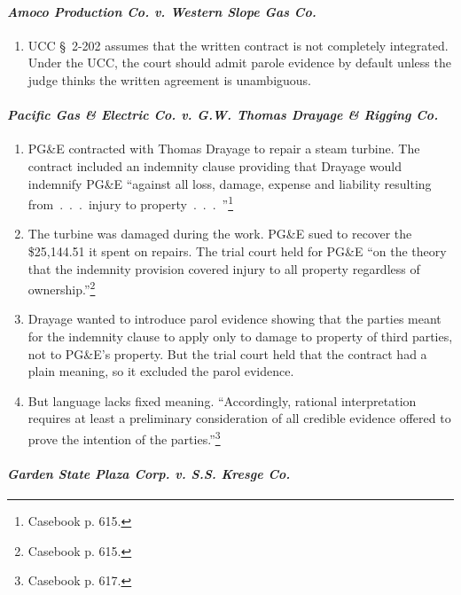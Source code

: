 \paragraph{\emph{Amoco Production Co. v. Western Slope Gas Co.}}

\begin{enumerate}
    \item UCC \S\ 2-202 assumes that the written contract is not completely 
    integrated. Under the UCC, the court should admit parole evidence by 
    default unless the judge thinks the written agreement is unambiguous.
\end{enumerate}

\paragraph{\emph{Pacific Gas \& Electric Co. v. G.W. Thomas Drayage \& Rigging 
Co.}}

\begin{enumerate}
    \item PG\&E contracted with Thomas Drayage to repair a steam turbine. The 
    contract included an indemnity clause providing that Drayage would 
    indemnify PG\&E ``against all loss, damage, expense and liability 
    resulting from~.~.~.~injury to property~.~.~.~''\footnote{Casebook p. 
    615.}
    \item The turbine was damaged during the work. PG\&E sued to recover the 
    \$25,144.51 it spent on repairs. The trial court held for PG\&E ``on the 
    theory that the indemnity provision covered injury to all property 
    regardless of ownership.''\footnote{Casebook p. 615.}
    \item Drayage wanted to introduce parol evidence showing that the parties 
    meant for the indemnity clause to apply only to damage to property of 
    third parties, not to PG\&E's property. But the trial court held that the 
    contract had a plain meaning, so it excluded the parol evidence.
    \item But language lacks fixed meaning. ``Accordingly, rational 
    interpretation requires at least a preliminary consideration of all 
    credible evidence offered to prove the intention of the 
    parties.''\footnote{Casebook p. 617.}
\end{enumerate}

\paragraph{\emph{Garden State Plaza Corp. v. S.S. Kresge Co.}}

